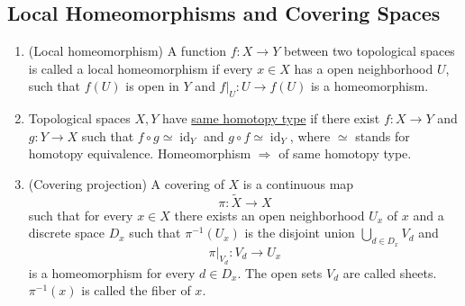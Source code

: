 \subsection{Local Homeomorphisms and Covering Spaces}
\begin{enumerate}
    \item (Local homeomorphism) A function $f: X\to Y$ between two topological spaces is called a local homeomorphism if every $x\in X$ has a open neighborhood $U$, such that $f(U)$ is open in $Y$ and $f|_U: U \to f(U)$ is a homeomorphism.
    \item Topological spaces $X, Y$ have \underline{same homotopy type} if there exist $f: X\to Y$ and $g: Y \to X$ such that $f\circ g \simeq \operatorname{id}_Y$ and $g \circ f \simeq \operatorname{id}_Y$, where $\simeq$ stands for homotopy equivalence. Homeomorphism $\Rightarrow$ of same homotopy type.
    \item (Covering projection) A covering of $X$ is a continuous map 
    \[ \pi: \tilde{X} \to X\] 
    such that for every $x\in X$ there exists an open neighborhood $U_x$ of $x$ and a discrete space $D_x$ such that $\pi^{-1}(U_x)$ is the disjoint union $\bigcup_{d\in D_x} V_d$ and 
    \[ \pi|_{V_d}: V_d \to U_x \]
    is a homeomorphism for every $d\in D_x$. The open sets $V_d$ are called sheets. $\pi^{-1}(x)$ is called the fiber of $x$.
\end{enumerate}

